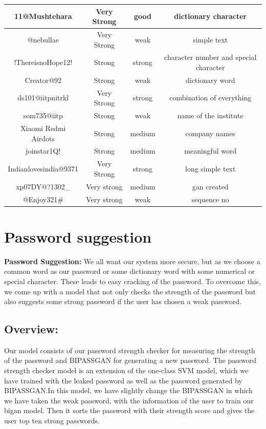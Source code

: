 \documentclass[runningheads]{llncs}
\begin{document}
{\begin{table}[htb]
\begin{tabular}{||c||c||c||c||}
\hline
11@Mushtehara &Very Strong&good& dictionary character\\
\hline
@nebullae&Very Strong&weak& simple text\\
\hline
!ThereisnoHope12!&Strong&strong& character number and special character \\
\hline
Creator@92&Strong&weak& dictionary word\\
\hline
ds101@iitpnitrkl&Very Strong&strong& combination of everything\\
\hline
som735@iitp&Strong&weak& name of the institute\\
\hline
Xiaomi Redmi Airdots&Strong&medium& company names\\
\hline
joinstar1Q!&Strong&medium& meaningful word\\
\hline
Indianlovesindia@9371&Very Strong&strong& long simple text\\
\hline
xp07DY@?1302_&Very strong&medium& gan created\\
\hline
@Enjoy321#&Very strong&weak&sequence no\\
    \hline
    \hline
\end{tabular}

\end{table}
}

\section{Password suggestion}

\textbf{Password Suggestion: }We all want our system more secure, but as we choose a common word as our password or some dictionary word with some numerical or special character. These leads to easy cracking of the password. To overcome this, we come up with a model that not only checks the strength of the password but also suggests some strong password if the user has chosen a weak password.
\subsection{Overview: }Our model consists of our password strength checker for measuring the strength of the password and BIPASSGAN for generating a new password. The password strength checker model is an extension of the one-class SVM model, which we have trained with the leaked password as well as the password generated by BIPASSGAN.In this model, we have slightly change the BIPASSGAN in which we have taken the weak password, with the information of the user to train our bigan model. Then it sorts the password with their strength score and gives the user top ten strong passwords.
\end{document}

